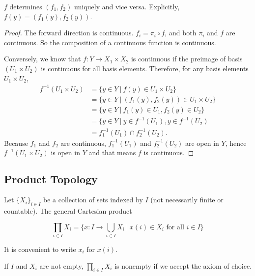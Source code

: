 \documentclass[article,11pt, reqno]{article}
\newtheorem*{theorem}{Theorem}
\theoremstyle{remark}
\newcommand{\<}{\langle}
\renewcommand{\>}{\rangle}
\begin{document}
$f$ determines $(f_1, f_2)$ uniquely and vice versa.
Explicitly, $f(y)=(f_1(y), f_2(y))$.\\
\begin{proof}
    The forward direction is continuous. $f_i = \pi_i\circ f$, and both $\pi_i$ and $f$ are continuous. So the composition of a continuous function is continuous.

    Conversely, we know that $f: Y\rightarrow X_1\times X_2$ is continuous if the preimage of basis $(U_{1}\times U_{2})$ is continuous for all basis elements. 
    Therefore, for any basis elements $U_1\times U_2$,
    \begin{equation*}
    \begin{aligned}
    f^{-1}(U_1\times U_2) &=\{y\in Y \ | \ f(y)\in U_1\times U_2\}\\
    &= \{y\in Y \ | \ (f_1(y), f_2(y))\in U_1\times U_2\}\\
    &=\{y\in Y \ | \ f_1(y)\in U_1, f_2(y)\in U_2\}\\
    &= \{y\in Y \ | \ y\in f^{-1}(U_1), y\in f^{-1}(U_2)\\
    &= f_1^{-1}(U_1)\cap f_2^{-1}(U_2).
    \end{aligned}
    \end{equation*}
    Because $f_1$ and $f_2$ are continuous, $f_1^{-1}(U_1)$ and $f_2^{-1}(U_2)$ are open in $Y$, hence $f^{-1}(U_1\times U_2)$ is open in $Y$ and that means $f$ is continuous.
\end{proof}

\subsection*{Product Topology}
Let $\{X_i\}_{i\in I}$ be a collection of sets indexed by $I$ (not necessarily finite or countable). The general Cartesian product

$$\prod_{i\in I} X_i = \{ x: I\rightarrow \bigcup_{i\in I} X_i\ | \ x(i)\in X_i \text{ for all } i\in I\}$$

It is convenient to write $x_i$ for $x(i)$.

If $I$ and $X_i$ are not empty, $\prod_{i\in I} X_i$ is nonempty if we accept the axiom of choice.
\end{document}
